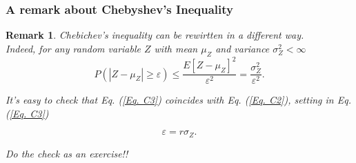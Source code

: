 \documentclass[notes=show,smaller,handout]{beamer}\usepackage[]{graphicx}\usepackage[]{color}
\newtheorem{remark}{Remark}[section]
\renewcommand{\Pr}{P}
\newenvironment{stepitemize}{\begin{itemize}[<+->]}{\end{itemize} }
\begin{document}
\begin{frame}%

\frametitle{A remark about Chebyshev's Inequality}

\begin{remark}
Chebichev's inequality can be rewirtten in a different way. \\

Indeed, for any random variable $Z$ with mean $\mu_Z$ and variance $\sigma_Z^2<\infty$
\begin{equation}
\Pr \left( \left\vert Z-\mu_Z\right\vert \geq \varepsilon \right) \leq \frac{E[Z-\mu_Z]^2}{\varepsilon^{2}} = \frac{\sigma_Z^2}{\varepsilon^{2}}. \label{Eq. C3}
\end{equation}

 It's easy to check  that Eq. (\ref{Eq. C3}) coincides with Eq. (\ref{Eq. C2}), setting in Eq. (\ref{Eq. C3})

 $$
 \varepsilon = r \sigma_Z.
 $$

 Do the check as an exercise!!
\end{remark}

\end{frame}%


%
%
%
%
\end{document}
